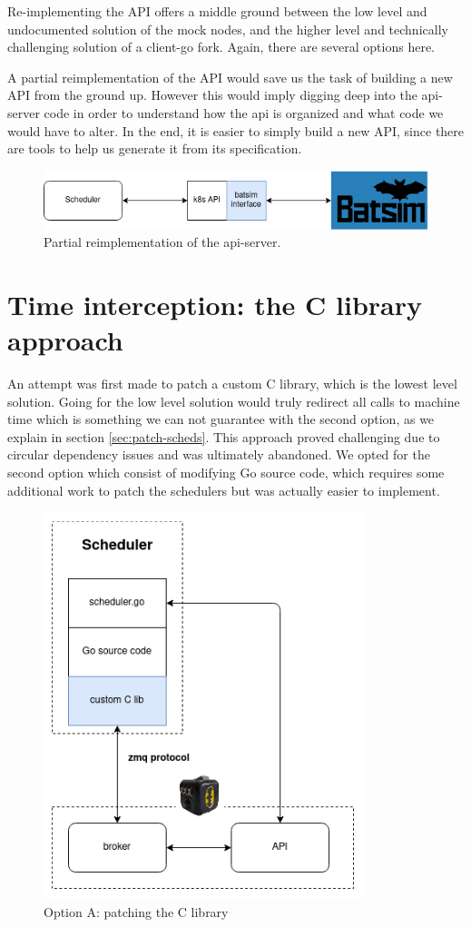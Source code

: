 Re-implementing the API offers a middle ground between the low level and
undocumented solution of the mock nodes, and the higher level and technically
challenging solution of a client-go fork. Again, there are several options here.

A partial reimplementation of the API would save us the task of building a new
API from the ground up. However this would imply digging deep into the
api-server code in order to understand how the api is organized and what code
we would have to alter. In the end, it is easier to simply build a new API,
since there are tools to help us generate it from its specification.

\begin{figure}[h]
	\centering
	\includegraphics[scale=0.8]{imgs/partial-reimplem.png}
	\caption{Partial reimplementation of the api-server.}
	\label{fig:partial_reimp}
\end{figure}

\section{Time interception: the C library approach}

An attempt was first made to patch a custom C library, which is the lowest level
solution. Going for the low level solution would truly redirect all calls to
machine time which is something we can not guarantee with the second option, as
we explain in section \ref{sec:patch-scheds}. This approach proved challenging
due to circular dependency issues and was ultimately abandoned. We opted for
the second option which consist of modifying Go source code, which requires
some additional work to patch the schedulers but was actually easier to
implement.

\begin{figure}
	\centering
	\includegraphics[scale=0.5]{imgs/time-hijack-C.png}
	\caption{Option A: patching the C library}
	\label{fig:patch-C}
\end{figure}

